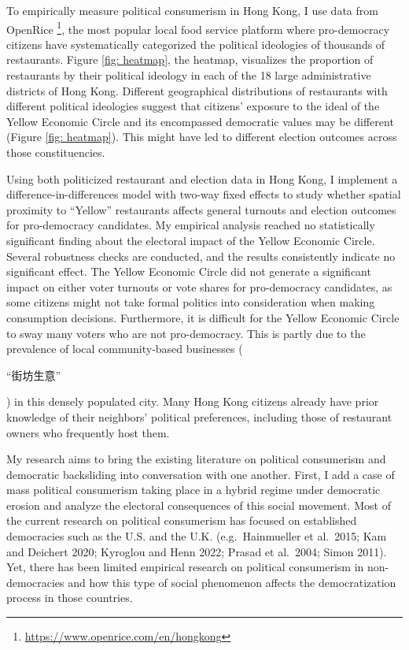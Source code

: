 \documentclass[letterpaper, 12pt]{article}
\begin{document}
To empirically measure political consumerism in Hong Kong, I use data from OpenRice \footnote{\url{https://www.openrice.com/en/hongkong}}, the most popular local food service platform where pro-democracy citizens have systematically categorized the political ideologies of thousands of restaurants. Figure \ref{fig: heatmap}, the heatmap, visualizes the proportion of restaurants by their political ideology in each of the 18 large administrative districts of Hong Kong. Different geographical distributions of restaurants with different political ideologies suggest that citizens' exposure to the ideal of the Yellow Economic Circle and its encompassed democratic values may be different (Figure \ref{fig: heatmap}). This might have led to different election outcomes across those constituencies.

Using both politicized restaurant and election data in Hong Kong, I implement a difference-in-differences model with two-way fixed effects to study whether spatial proximity to ``Yellow'' restaurants affects general turnouts and election outcomes for pro-democracy candidates. My empirical analysis reached no statistically significant finding about the electoral impact of the Yellow Economic Circle. Several robustness checks are conducted, and the results consistently indicate no significant effect. The Yellow Economic Circle did not generate a significant impact on either voter turnouts or vote shares for pro-democracy candidates, as some citizens might not take formal politics into consideration when making consumption decisions. Furthermore, it is difficult for the Yellow Economic Circle to sway many voters who are not pro-democracy. This is partly due to the prevalence of local community-based businesses (\begin{CJK*}{UTF8}{bkai}``街坊生意''\end{CJK*}) in this densely populated city. Many Hong Kong citizens already have prior knowledge of their neighbors' political preferences, including those of restaurant owners who frequently host them.

My research aims to bring the existing literature on political consumerism and democratic backsliding into conversation with one another. First, I add a case of mass political consumerism taking place in a hybrid regime under democratic erosion and analyze the electoral consequences of this social movement. Most of the current research on political consumerism has focused on established democracies such as the U.S. and the U.K. (e.g.\ Hainmueller et al.\ 2015; Kam and Deichert 2020; Kyroglou and Henn 2022; Prasad et al.\ 2004; Simon 2011). Yet, there has been limited empirical research on political consumerism in non-democracies and how this type of social phenomenon affects the democratization process in those countries.
\end{document}
